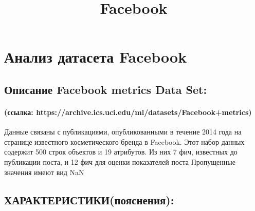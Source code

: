 \documentclass[11pt]{article}
\title{Facebook}
\begin{document}
    
    
    \maketitle
    
    

    
    \section{Анализ датасета
Facebook}\label{ux430ux43dux430ux43bux438ux437-ux434ux430ux442ux430ux441ux435ux442ux430-facebook}

\subsection{Описание Facebook metrics Data
Set:}\label{ux43eux43fux438ux441ux430ux43dux438ux435-facebook-metrics-data-set}

\paragraph{(ссылка:
https://archive.ics.uci.edu/ml/datasets/Facebook+metrics)}\label{ux441ux441ux44bux43bux43aux430-httpsarchive.ics.uci.edumldatasetsfacebookmetrics}

Данные связаны с публикациями, опубликованными в течение 2014 года на
странице известного косметического бренда в Facebook. Этот набор данных
содержит 500 строк объектов и 19 атрибутов. Из них 7 фич, известных до
публикации поста, и 12 фич для оценки показателей поста Пропущенные
значения имеют вид NaN

    \subsection{ХАРАКТЕРИСТИКИ(пояснения):}\label{ux445ux430ux440ux430ux43aux442ux435ux440ux438ux441ux442ux438ux43aux438ux43fux43eux44fux441ux43dux435ux43dux438ux44f}
\end{document}
